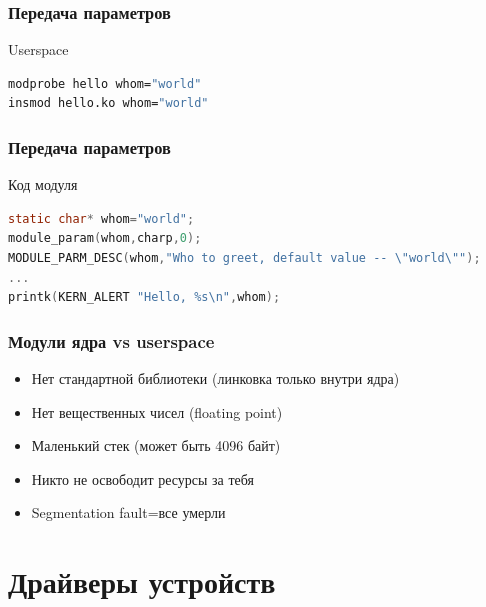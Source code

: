 \begin{frame}[fragile]
  \frametitle{Передача параметров}
\begin{center}
  Userspace
\end{center}
\begin{lstlisting}[language=bash]
modprobe hello whom="world"
insmod hello.ko whom="world"
\end{lstlisting}
\end{frame}

\begin{frame}[fragile]
  \frametitle{Передача параметров}
\begin{center}
  Код модуля 
\end{center}
\begin{lstlisting}[language=C]
static char* whom="world";
module_param(whom,charp,0);
MODULE_PARM_DESC(whom,"Who to greet, default value -- \"world\"");
...
printk(KERN_ALERT "Hello, %s\n",whom);
\end{lstlisting}
\end{frame}

\begin{frame}
  \frametitle{Модули ядра vs userspace}
  \begin{itemize}
    \item Нет стандартной библиотеки (линковка только внутри ядра)
    \item Нет вещественных чисел (floating point)
    \item Маленький стек (может быть 4096 байт)
    \item Никто не освободит ресурсы за тебя
    \item Segmentation fault=все умерли
  \end{itemize}
\end{frame}

\section{Драйверы устройств}
